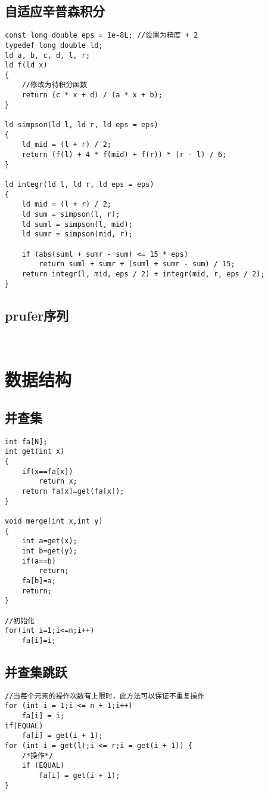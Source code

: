 \documentclass[twocolumn,a4]{article}
\begin{document}
\subsection{自适应辛普森积分}
\begin{lstlisting}
const long double eps = 1e-8L; //设置为精度 + 2
typedef long double ld;
ld a, b, c, d, l, r;
ld f(ld x)
{
    //修改为待积分函数
    return (c * x + d) / (a * x + b);
}

ld simpson(ld l, ld r, ld eps = eps)
{
    ld mid = (l + r) / 2;
    return (f(l) + 4 * f(mid) + f(r)) * (r - l) / 6;
}

ld integr(ld l, ld r, ld eps = eps)
{
    ld mid = (l + r) / 2;
    ld sum = simpson(l, r);
    ld suml = simpson(l, mid);
    ld sumr = simpson(mid, r);

    if (abs(suml + sumr - sum) <= 15 * eps)
        return suml + sumr + (suml + sumr - sum) / 15;
    return integr(l, mid, eps / 2) + integr(mid, r, eps / 2);
}
\end{lstlisting}

\subsection{prufer序列}
\begin{lstlisting}
    
\end{lstlisting}
\section{数据结构}

\subsection{并查集}
\begin{lstlisting}
int fa[N];
int get(int x)
{
    if(x==fa[x])
        return x;
    return fa[x]=get(fa[x]);
}

void merge(int x,int y)
{
    int a=get(x);
    int b=get(y);
    if(a==b)
        return;
    fa[b]=a;
    return;
}

//初始化
for(int i=1;i<=n;i++)
    fa[i]=i;
\end{lstlisting}

\subsection{并查集跳跃}
\begin{lstlisting}
//当每个元素的操作次数有上限时，此方法可以保证不重复操作
for (int i = 1;i <= n + 1;i++)
    fa[i] = i;
if(EQUAL)
    fa[i] = get(i + 1);
for (int i = get(l);i <= r;i = get(i + 1)) {
    /*操作*/
    if (EQUAL)
        fa[i] = get(i + 1);
}
\end{lstlisting}
\end{document}
